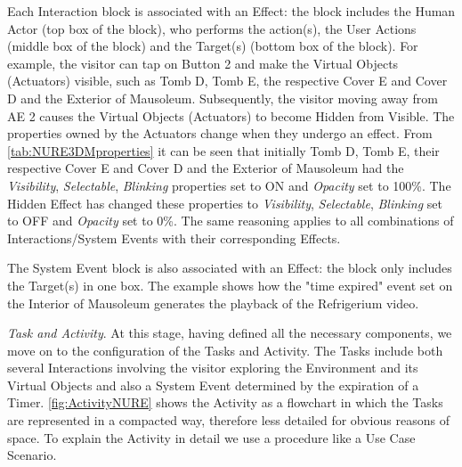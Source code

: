 Each Interaction block is associated with an Effect: the block includes the Human Actor (top box of the block), who performs the action(s), the User Actions (middle box of the block) and the Target(s) (bottom box of the block). For example, the visitor can tap on Button 2 and make the Virtual Objects (Actuators) visible, such as Tomb D, Tomb E, the respective Cover E and Cover D and the Exterior of Mausoleum. Subsequently, the visitor moving away from AE 2 causes the Virtual Objects (Actuators) to become Hidden from Visible. The properties owned by the Actuators change when they undergo an effect. 
From \autoref{tab:NURE3DMproperties} it can be seen that initially Tomb D, Tomb E, their respective Cover E and Cover D and the Exterior of Mausoleum had the \textit{Visibility}, \textit{Selectable}, \textit{Blinking} properties set to ON and \textit{Opacity} set to 100\%. The Hidden Effect has changed these properties to \textit{Visibility}, \textit{Selectable}, \textit{Blinking} set to OFF and \textit{Opacity} set to 0\%. 
The same reasoning applies to all combinations of Interactions/System Events with their corresponding Effects.

The System Event block is also associated with an Effect: the block only includes the Target(s) in one box. The example shows how the "time expired" event set on the Interior of Mausoleum generates the playback of the Refrigerium video.

\emph{Task and Activity}. At this stage, having defined all the necessary components, we move on to the configuration of the Tasks and Activity. The Tasks include both several Interactions involving the visitor exploring the Environment and its Virtual Objects and also a System Event determined by the expiration of a Timer. \autoref{fig:ActivityNURE} shows the Activity as a flowchart in which the Tasks are represented in a compacted way, therefore less detailed for obvious reasons of space. To explain the Activity in detail we use a procedure like a Use Case Scenario.

